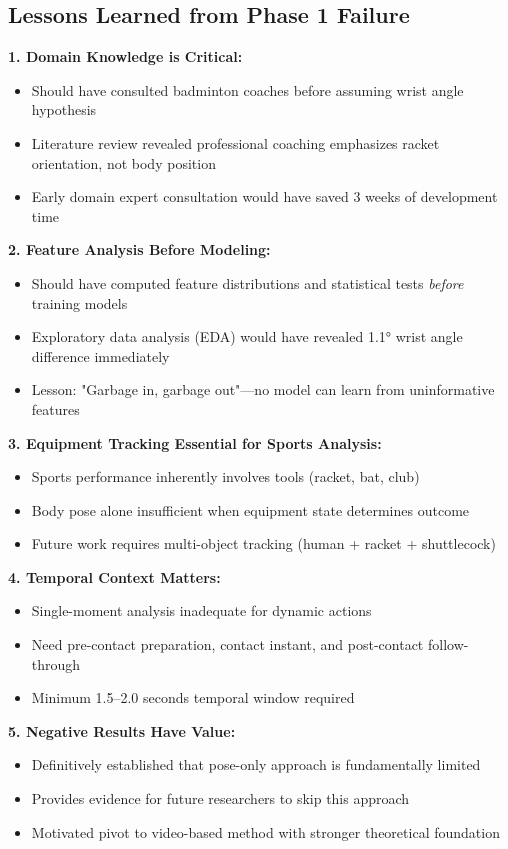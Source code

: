 \documentclass[11pt,a4paper]{article}
\begin{document}
\subsection{Lessons Learned from Phase 1 Failure}

\textbf{1. Domain Knowledge is Critical:}
\begin{itemize}
\item Should have consulted badminton coaches before assuming wrist angle hypothesis
\item Literature review revealed professional coaching emphasizes racket orientation, not body position
\item Early domain expert consultation would have saved 3 weeks of development time
\end{itemize}

\textbf{2. Feature Analysis Before Modeling:}
\begin{itemize}
\item Should have computed feature distributions and statistical tests \textit{before} training models
\item Exploratory data analysis (EDA) would have revealed 1.1° wrist angle difference immediately
\item Lesson: "Garbage in, garbage out"---no model can learn from uninformative features
\end{itemize}

\textbf{3. Equipment Tracking Essential for Sports Analysis:}
\begin{itemize}
\item Sports performance inherently involves tools (racket, bat, club)
\item Body pose alone insufficient when equipment state determines outcome
\item Future work requires multi-object tracking (human + racket + shuttlecock)
\end{itemize}

\textbf{4. Temporal Context Matters:}
\begin{itemize}
\item Single-moment analysis inadequate for dynamic actions
\item Need pre-contact preparation, contact instant, and post-contact follow-through
\item Minimum 1.5--2.0 seconds temporal window required
\end{itemize}

\textbf{5. Negative Results Have Value:}
\begin{itemize}
\item Definitively established that pose-only approach is fundamentally limited
\item Provides evidence for future researchers to skip this approach
\item Motivated pivot to video-based method with stronger theoretical foundation
\end{itemize}
\end{document}
